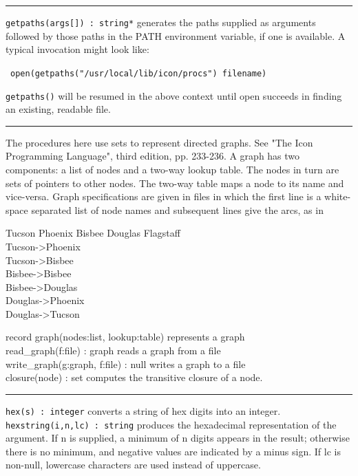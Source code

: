 \vspace{0.25cm}\hrule{}

\texttt{getpaths(args[]) : string*} generates the paths supplied as
arguments followed by those paths in the PATH environment variable, if one is available. A typical
invocation might look like:

\ \texttt{open(getpaths("/usr/local/lib/icon/procs")
{\textbar}{\textbar} filename)}

\texttt{getpaths()} will be resumed in the above context until open
succeeds in finding an existing, readable file.

\vspace{0.25cm}\hrule{}

The procedures here use sets to represent directed graphs.
See "The Icon Programming Language", third
edition, pp. 233-236. A graph has two components: a list of nodes and a
two-way lookup table. The nodes in turn are sets of
pointers to other nodes. The two-way table maps a node
to its name and vice-versa. Graph specifications are given in files in
which the first line is a white-space separated list of node names and
subsequent lines give the arcs, as in

Tucson Phoenix Bisbee Douglas Flagstaff\\
Tucson-{\textgreater}Phoenix\\
Tucson-{\textgreater}Bisbee\\
Bisbee-{\textgreater}Bisbee\\
Bisbee-{\textgreater}Douglas\\
Douglas-{\textgreater}Phoenix\\
Douglas-{\textgreater}Tucson

record graph(nodes:list, lookup:table) represents a graph\\
read\_graph(f:file) : graph reads a graph from a file\\
write\_graph(g:graph, f:file) : null writes a graph to a file\\
closure(node) : set computes the transitive closure of a node.
\ \ \ \ \ \ 

\vspace{0.25cm}\hrule{}

\texttt{hex(s) : integer} converts a string of hex digits into an
integer.\\
\texttt{hexstring(i,n,lc) : string} produces the
hexadecimal representation of the argument. If n is
supplied, a minimum of n digits appears in the result; otherwise there
is no minimum, and negative values are indicated by a minus sign. If lc
is non-null, lowercase characters are used instead of uppercase.

